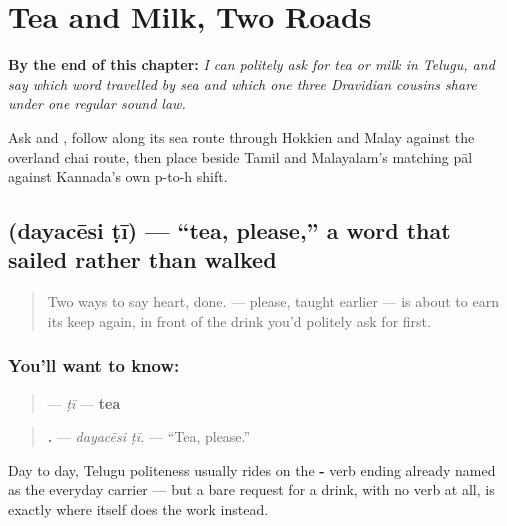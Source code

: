 
\chapter{Tea and Milk, Two Roads}
\label{ch:te-tea-and-milk}

\begin{chapteropening}
\textbf{By the end of this chapter:} \emph{I can politely ask for tea or milk in Telugu, and say which word travelled by sea and which one three Dravidian cousins share under one regular sound law.}

Ask   and  , follow  along its sea route through Hokkien and Malay against the overland chai route, then place  beside Tamil and Malayalam's matching pāl against Kannada's own p-to-h shift.
\end{chapteropening}

\section[dayacēsi ṭī]{  (dayacēsi ṭī) — \textquotedblleft{}tea, please,\textquotedblright{} a word that sailed rather than walked}

\label{lesson:TE-C39-tii}



\begin{quote}
Two ways to say heart, done. \textbf{} — please, taught earlier — is about to earn its keep again, in front of the drink you'd politely ask for first.
\end{quote}

\subsection*{You'll want to know: }
\begin{quote}
\textbf{} — \emph{ṭī} — \textbf{tea}
\end{quote}

\begin{quote}
\textbf{ .} — \emph{dayacēsi ṭī.} — \textquotedblleft{}Tea, please.\textquotedblright{}
\end{quote}

Day to day, Telugu politeness usually rides on the \textbf{-} verb ending already named as the everyday carrier — but a bare request for a drink, with no verb at all, is exactly where \textbf{} itself does the work instead.

